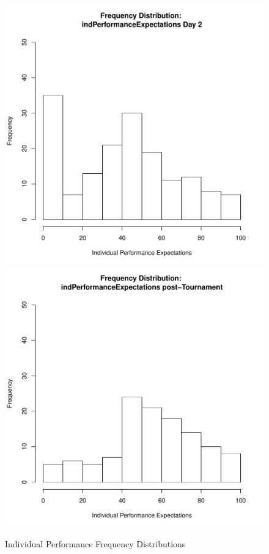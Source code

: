 \documentclass[12pt]{report}
\begin{document}
{\begin{figure}[htbp]
  \includegraphics[scale =.4]{../images/distIndPerfExpDay2.pdf}
  \includegraphics[scale =.4]{../images/distIndPerfExpPost.pdf}
  \caption{Individual Performance Frequency Distributions}

\end{figure}}
\end{document}

